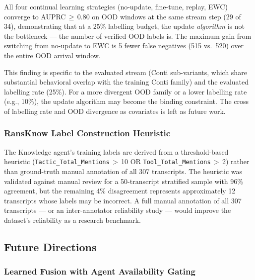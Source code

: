 \documentclass[journal]{IEEEtran}
\begin{document}
All four continual learning strategies (no-update, fine-tune, replay, EWC) converge to
AUPRC\,$\geq$\,0.80 on OOD windows at the same stream step (29 of 34), demonstrating that
at a 25\% labelling budget, the update \emph{algorithm} is not the bottleneck --- the
number of verified OOD labels is.
The maximum gain from switching from no-update to EWC is 5 fewer false negatives
(515 vs.\ 520) over the entire OOD arrival window.

This finding is specific to the evaluated stream (Conti sub-variants, which share
substantial behavioral overlap with the training Conti family) and the evaluated labelling
rate (25\%).
For a more divergent OOD family or a lower labelling rate (e.g., 10\%), the update
algorithm may become the binding constraint.
The cross of labelling rate and OOD divergence as covariates is left as future work.

\subsubsection{RansKnow Label Construction Heuristic}

The Knowledge agent's training labels are derived from a threshold-based heuristic
(\texttt{Tactic\_Total\_Mentions}\,$>$\,10 OR \texttt{Tool\_Total\_Mentions}\,$>$\,2)
rather than ground-truth manual annotation of all 307 transcripts.
The heuristic was validated against manual review for a 50-transcript stratified sample
with 96\% agreement, but the remaining 4\% disagreement represents approximately 12
transcripts whose labels may be incorrect.
A full manual annotation of all 307 transcripts --- or an inter-annotator reliability
study --- would improve the dataset's reliability as a research benchmark.

\subsection{Future Directions}

\subsubsection{Learned Fusion with Agent Availability Gating}
\end{document}
